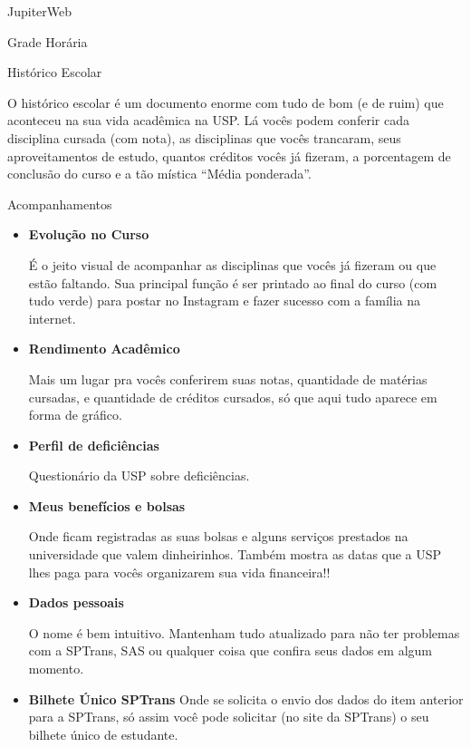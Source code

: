 \begin{secao}{JupiterWeb}
\begin{subsecao}{Grade Horária}
\end{subsecao}
\begin{subsecao}{Histórico Escolar}

O histórico escolar é um documento enorme com tudo de bom (e de ruim) que
aconteceu na sua vida acadêmica na USP. Lá vocês podem conferir cada
disciplina cursada (com nota), as disciplinas que vocês trancaram, seus
aproveitamentos de estudo, quantos créditos vocês já fizeram, a porcentagem de
conclusão do curso e a tão mística “Média ponderada”.

\end{subsecao}

\begin{subsecao}{Acompanhamentos}

\begin{itemize}
  \item \textbf{Evolução no Curso}

    É o jeito visual de acompanhar as disciplinas que vocês já fizeram ou que
    estão faltando. Sua principal função é ser printado ao final do curso (com
    tudo verde) para postar no Instagram e fazer sucesso com a família na
    internet.
  \item \textbf{Rendimento Acadêmico}

    Mais um lugar pra vocês conferirem suas notas, quantidade de matérias
    cursadas, e quantidade de créditos cursados, só que aqui tudo aparece em
    forma de gráfico.
  \item \textbf{Perfil de deficiências}

    Questionário da USP sobre deficiências.

  \item \textbf{Meus benefícios e bolsas}

    Onde ficam registradas as suas bolsas e alguns serviços prestados na
    universidade que valem dinheirinhos. Também mostra as datas que a USP lhes
    paga para vocês organizarem sua vida financeira!!

  \item \textbf{Dados pessoais}

    O nome é bem intuitivo. Mantenham tudo atualizado para não ter problemas com
    a SPTrans, SAS ou qualquer coisa que confira seus dados em algum momento.

  \item \textbf{Bilhete Único SPTrans}
    Onde se solicita o envio dos dados do item anterior para a SPTrans, só assim
    você pode solicitar (no site da SPTrans) o seu bilhete único de estudante.


\end{itemize}
\end{subsecao}
\end{secao}
